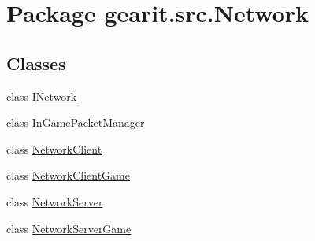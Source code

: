 \hypertarget{namespacegearit_1_1src_1_1_network}{\section{Package gearit.\+src.\+Network}
\label{namespacegearit_1_1src_1_1_network}
}
\subsection*{Classes}
\begin{DoxyCompactItemize}
\item 
class \hyperlink{classgearit_1_1src_1_1_network_1_1_i_network}{I\+Network}
\item 
class \hyperlink{classgearit_1_1src_1_1_network_1_1_in_game_packet_manager}{In\+Game\+Packet\+Manager}
\item 
class \hyperlink{classgearit_1_1src_1_1_network_1_1_network_client}{Network\+Client}
\item 
class \hyperlink{classgearit_1_1src_1_1_network_1_1_network_client_game}{Network\+Client\+Game}
\item 
class \hyperlink{classgearit_1_1src_1_1_network_1_1_network_server}{Network\+Server}
\item 
class \hyperlink{classgearit_1_1src_1_1_network_1_1_network_server_game}{Network\+Server\+Game}
\end{DoxyCompactItemize}
